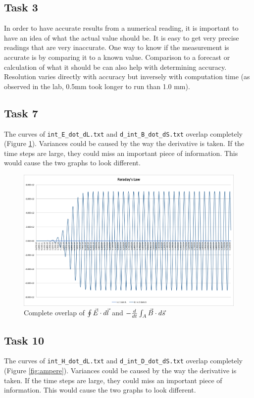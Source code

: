 \subsection{Task 3}
In order to have accurate results from a numerical reading, it is important to have an idea of what the actual value should be. It is easy to get very precise readings that are very inaccurate. One way to know if the measurement is accurate is by comparing it to a known value. Comparison to a forecast or calculation of what it should be can also help with determining accuracy. Resolution varies directly with accuracy but inversely with computation time (as observed in the lab, 0.5mm took longer to run than 1.0 mm).

\subsection{Task 7}
The curves of \texttt{int\_E\_dot\_dL.txt} and \texttt{d\_int\_B\_dot\_dS.txt} overlap completely (Figure \ref{fig:faraday}). Variances could be caused by the way the derivative is taken. If the time steps are large, they could miss an important piece of information. This would cause the two graphs to look different. 

\begin{figure}[tbph]
\centering
\includegraphics[width=0.95\linewidth]{graphics/faraday}
\caption{Complete overlap of $\oint \vec{E} \cdot d\vec{l}$ and $-{d \over dt} \int_A \vec{B} \cdot d\vec{s}$}
\label{fig:faraday}
\end{figure}

\subsection{Task 10}
The curves of \texttt{int\_H\_dot\_dL.txt} and \texttt{d\_int\_D\_dot\_dS.txt} overlap completely (Figure \ref{fig:ampere}). Variances could be caused by the way the derivative is taken. If the time steps are large, they could miss an important piece of information. This would cause the two graphs to look different. 


